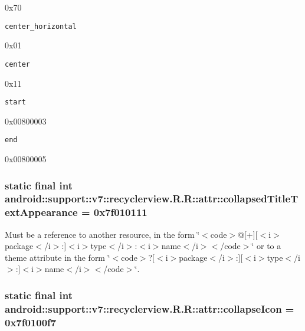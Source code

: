 0x70

{\tt center\_\-horizontal}

0x01

{\tt center}

0x11

{\tt start}

0x00800003

{\tt end}

0x00800005\hypertarget{classandroid_1_1support_1_1v7_1_1recyclerview_1_1_r_1_1attr_d7c1187f24486d955392f24e12d79faf}{
\subsubsection[{collapsedTitleTextAppearance}]{\setlength{\rightskip}{0pt plus 5cm}static final int android::support::v7::recyclerview.R.R::attr::collapsedTitleTextAppearance = 0x7f010111}}
\label{classandroid_1_1support_1_1v7_1_1recyclerview_1_1_r_1_1attr_d7c1187f24486d955392f24e12d79faf}


Must be a reference to another resource, in the form \char`\"{}$<$code$>$@\mbox{[}+\mbox{]}\mbox{[}$<$i$>$package$<$/i$>$:\mbox{]}$<$i$>$type$<$/i$>$:$<$i$>$name$<$/i$>$$<$/code$>$\char`\"{} or to a theme attribute in the form \char`\"{}$<$code$>$?\mbox{[}$<$i$>$package$<$/i$>$:\mbox{]}\mbox{[}$<$i$>$type$<$/i$>$:\mbox{]}$<$i$>$name$<$/i$>$$<$/code$>$\char`\"{}. \hypertarget{classandroid_1_1support_1_1v7_1_1recyclerview_1_1_r_1_1attr_771db84ec9c1b3e1c2c4cfed749a0547}{
\subsubsection[{collapseIcon}]{\setlength{\rightskip}{0pt plus 5cm}static final int android::support::v7::recyclerview.R.R::attr::collapseIcon = 0x7f0100f7}}
\label{classandroid_1_1support_1_1v7_1_1recyclerview_1_1_r_1_1attr_771db84ec9c1b3e1c2c4cfed749a0547}


